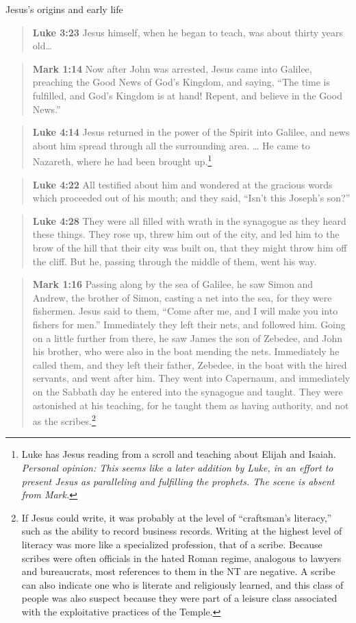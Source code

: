 \documentclass[8pt]{article}
\newcommand{\quotesize}{\large{}}
\newenvironment{quotetext}{\begin{quote}\quotesize}{\end{quote}}
\newcommand{\bible}[2]{\begin{quotetext}\textbf{#1} #2\end{quotetext}}
\newcommand{\gospelmark}[2]{\bible{Mark #1}{#2}}
\newcommand{\luke}[2]{\bible{Luke #1}{#2}}
\newcommand{\personal}[1]{\emph{Personal opinion:\/ #1}}
\begin{document}
\begin{section}{Jesus's origins and early life}
\luke{3:23}{Jesus himself, when he began to teach, was about thirty years old\ldots}

\gospelmark{1:14}{ Now after John was arrested, Jesus came
into Galilee, preaching the Good News of God’s Kingdom, and saying,
``The time is fulfilled, and God’s Kingdom is at hand! Repent, and
believe in the Good News.''}

\luke{4:14}{Jesus returned in the power of the Spirit into Galilee, and news about him spread through all the surrounding area. \ldots
  He came to Nazareth, where he had been brought up.\footnote{Luke has Jesus reading from a scroll and teaching about Elijah and
Isaiah. \personal{This seems like a later addition by Luke, in an effort to present Jesus as paralleling and fulfilling the prophets. The scene
is absent from Mark.}}}

\luke{4:22}{All testified about him and wondered at the gracious words which proceeded out of his mouth; and they said, ``Isn't this Joseph's son?''}

\luke{4:28}{ They were all filled with wrath in the synagogue as they heard these things.   They rose up, threw him out of the city, and led him to the brow of the hill that their city was built on, that they might throw him off the cliff.   But he, passing through the middle of them, went his way.}

\gospelmark{1:16}{Passing along by the sea of Galilee, he saw Simon
  and Andrew, the brother of Simon, casting a net into the sea, for
  they were fishermen.  Jesus said to them, ``Come after me, and I
  will make you into fishers for men.''  Immediately they left their
  nets, and followed him.  Going on a little further from there, he
  saw James the son of Zebedee, and John his brother, who were also in
  the boat mending the nets.  Immediately he called them, and they
  left their father, Zebedee, in the boat with the hired servants, and
  went after him.  They went into Capernaum, and immediately on the
  Sabbath day he entered into the synagogue and taught.  They were
  astonished at his teaching, for he taught them as having authority,
  and not as the scribes.\footnote{ If Jesus could write, it was
probably at the level of ``craftsman's literacy,'' such as the ability
to record business records. Writing at the highest level of literacy
was more like a specialized profession, that of a scribe. Because
scribes were often officials in the hated Roman regime, analogous to lawyers and bureaucrats, most
references to them in the NT are negative. A scribe can also indicate one
who is literate and religiously learned, and this class of people was also
suspect because they were part of a leisure class associated with the exploitative practices of the Temple.}}


\end{section}
\end{document}
